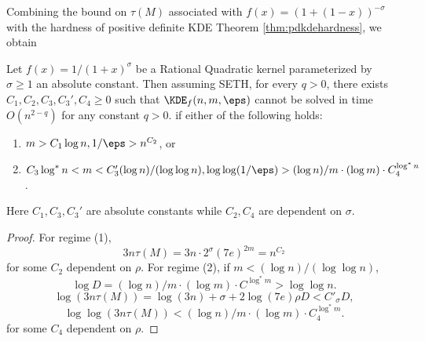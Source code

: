 Combining the bound on $\tau(M)$ associated with $f(x) = (1 + (1-x))^{-\sigma}$ with the hardness of positive definite KDE Theorem \ref{thm:pdkdehardness}, we obtain
\begin{theorem}
Let $f(x) = 1/(1+x)^\sigma$ be a Rational Quadratic kernel parameterized by $\sigma \ge 1$ an absolute constant.
Then assuming SETH, for every $q > 0$, there exists $C_1, C_2, C_3, C_3', C_4 \ge 0$ such that $\KDE_f(n, m, \eps)$ cannot be solved in time $O(n^{2-q})$ for any constant $q>0$. if either of the following holds:
\begin{enumerate}[(1)]
\item $m > C_1\log n, 1/\eps > n^{C_2}$, or
\item $C_3\log^* n < m < C_3'(\log n)/(\log\log n), \log\log(1/\eps) > (\log n)/m \cdot (\log m) \cdot C_4^{\log^*n}$.
\end{enumerate}
Here $C_1, C_3, C_3'$ are absolute constants while $C_2, C_4$ are dependent on $\sigma$.
\end{theorem}
\begin{proof}
For regime (1), 
\[3n\tau(M) = 3n\cdot 2^{\sigma}(7e)^{2m} = n^{C_2}\]
for some $C_2$ dependent on $\rho$. For regime (2), if $m < (\log n)/(\log \log n)$,
\[\log D = (\log n)/m \cdot (\log m) \cdot C^{\log^* m} > \log \log n.\]
\[\log(3n\tau(M)) = \log(3n) + \sigma + 2\log(7e)\rho D < C'_\sigma D,\]
\[\log\log(3n\tau(M)) < (\log n)/m \cdot (\log m) \cdot C_4^{\log^* m}.\]
for some $C_4$ dependent on $\rho$.
\end{proof}














































